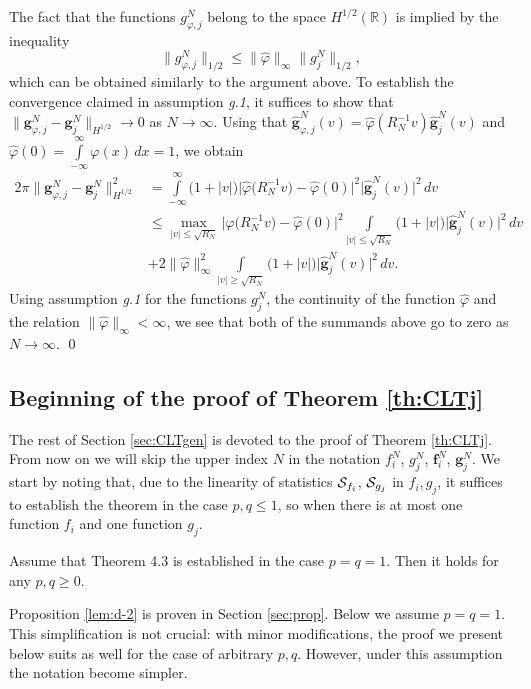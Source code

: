 \documentclass{article}
\numberwithin{equation}{section}
\newcommand{\mR}{\mathbb{R}}
\newcommand{\SSS}{{\cal S}}
\newcommand{\ph}{\varphi}
\newcommand{\ra}{\rightarrow}
\newcommand{\ili}{\int\limits}
\newcommand{\ilif}{\ili_{-\infty}^\infty}
\newcommand{\lbl}{\label}
\newcommand{\rprop}{Proposition \nolinebreak}
\newcommand{\rtheo}{Theorem \nolinebreak}
\newcommand{\rsec}{Section \nolinebreak}
\newcommand{\bpp}{\begin{prop}}
\newcommand{\epp}{\end{prop}}
\newcommand{\non}{\nonumber}
\begin{document}
The fact that the functions $g_{\ph,j}^N$ belong to
the space $H^{1/2}(\mR)$ is implied by the inequality
$$
\|g_{\ph,j}^N\|_{1/2}
\leq \|\hat\ph\|_\infty \|g_{j}^N\|_{1/2},
$$
which can be obtained similarly to the argument above.
To establish the convergence claimed in assumption \emph{g.1},
it suffices to show that
$\|\bm g_{\ph,j}^N-\bm g_j^N\|_{H^{1/2}}\ra 0$ as $N\ra\infty$.
Using that
$\hat {\bm g}^N_{\ph,j}(v) = \hat\ph(R_N^{-1} v)\hat {\bm g}^N_{j}(v)$
and
$\hat \ph (0)=\ilif\ph(x)\,dx=1$,
we obtain
\begin{align} \non
2\pi\|\bm g_{\ph,j}^N-\bm g_j^N\|_{H^{1/2}}^2
&=\ili_{-\infty}^\infty
\big(1+|v|\big)\big|\hat \ph \big(R_N^{-1}v\big) -  \hat \ph (0) \big|^2
\big|\hat {\bm g}^N_{j}(v)\big|^2\, dv
\\\non
&\leq
\max_{|v|\leq\sqrt{R_N}}
\big|\hat \ph \big(R_N^{-1}v\big) -  \hat \ph (0) \big|^2
\ili_{|v|\leq\sqrt{R_N}}
\big(1+|v|\big)\big|\hat {\bm g}^N_{j}(v)\big|^2\,dv
\\\non
&+
2\|\hat\ph\|^2_\infty
\ili_{|v|\geq\sqrt{R_N}}
\big(1+|v|\big)\big|\hat {\bm g}^N_{j}(v)\big|^2 \,dv.
\end{align}
Using  assumption \emph{g.1} for the functions $g_j^N$, the continuity of the function $\hat\ph$
and the relation $\|\hat\ph\|_\infty<\infty$,
we see that
both of the summands above go to zero as $N\ra\infty$.
\qed
%
%
%
%
%
%
\subsection{Beginning of the proof of Theorem \ref{th:CLTj} }
The rest of \rsec\ref{sec:CLTgen} is devoted to the proof of \rtheo \ref{th:CLTj}.
From now on we will skip the upper index $N$ in the notation
$f_i^N$, $g_j^N$, $\bm f_i^N$, $\bm g_j^N$.
We start by noting that, due to the linearity of statistics $\SSS_{f_i}$, $\SSS_{g_j}$ 
in $f_i,g_j$, it suffices to establish the theorem in the case $p,q\leq 1$, so when there is at most one function $f_i$ and one function $g_j$.
\bpp\lbl{lem:d-2}
Assume that Theorem 4.3 is established in the case $p=q=1$. 
Then it holds for any $p,q\geq 0$.
\epp
 \rprop\ref{lem:d-2} is proven in \rsec\ref{sec:prop}. Below we assume $p=q=1$.
 This simplification is not crucial: 
 with minor modifications, the proof we present below suits as well for the case of arbitrary $p,q$. 
 However, under this assumption the notation become simpler.
 
\end{document}
